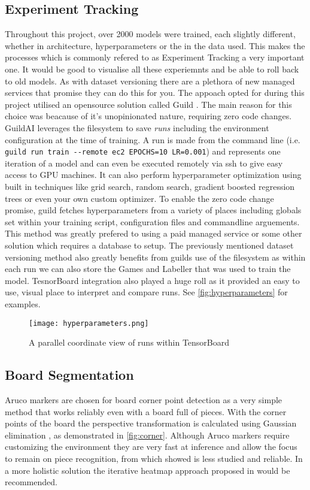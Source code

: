 \subsection{Experiment Tracking}
Throughout this project, over 2000 models were trained, each slightly different, whether in architecture, hyperparameters or the in the data used.  
This makes the processes which is commonly refered to as Experiment Tracking a very important one.
It would be good to visualise all these experiemnts and be able to roll back to old models.  As with dataset versioning there are a plethora of 
new managed services that promise they can do this for you.
The appoach opted for during this project utilised an opensource solution called Guild \cite{}.  The main reason for this choice was beacause of 
it's unopinionated nature, requiring zero code changes.  GuildAI leverages the filesystem to save \textit{runs} including the environment configuration
at the time of training.  A run is made from the command line (i.e. \verb|guild run train --remote ec2 EPOCHS=10 LR=0.001|) and
represents one iteration of a model and can even be executed remotely via ssh to give easy access to 
GPU machines.  It can also perform hyperparameter optimization using built in techniques like grid search, random search, gradient boosted regression trees 
or even your own custom optimizer.  To enable the zero code change promise, guild fetches hyperparameters from a variety of places including globals set within 
your training script, configuration files and commandline arguements.
This method was greatly prefered to using a paid managed service or some other solution which requires a database to setup.  
The previously mentioned dataset versioning method also greatly benefits from guilds use of the filesystem as within each run we can also store 
the Games and Labeller that was used to train the model. 
TesnorBoard integration also played a huge roll as it provided an easy to use, visual place to interpret and compare runs.  See \autoref{fig:hyperparameters}
for examples.

\begin{figure}[h]
    \centering
    \texttt{[image: hyperparameters.png]}
    \caption{A parallel coordinate view of runs within TensorBoard}
    \label{fig:hyperparameters}
\end{figure}

\subsection{Board Segmentation}
Aruco markers are chosen for board corner point detection as a very simple method that works reliably even with a board full of pieces.
With the corner points of the board the perspective transformation is calculated using
Gaussian elimination \cite{gauss}, as demonstrated in \autoref{fig:corner}.
Although Aruco markers require customizing the environment they are very fast at 
inference and allow the focus to remain on piece recognition, from which
 showed is less studied and reliable.  In a more holistic solution the 
iterative heatmap approach proposed in \cite{heatmap} would be recommended.

